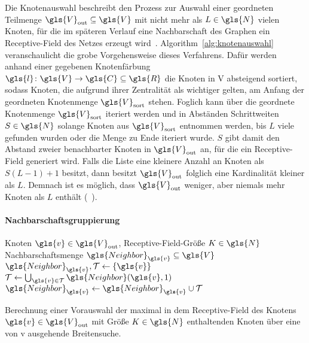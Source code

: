 Die Knotenauswahl beschreibt den Prozess zur Auswahl einer geordneten Teilmenge $\gls{V}_{\mathrm{out}} \subseteq \gls{V}$ mit nicht mehr als $L \in \gls{N}$ vielen Knoten, für die im späteren Verlauf eine Nachbarschaft des Graphen \bzw{} ein Receptive-Field des Netzes erzeugt wird~\cite{patchy}.
Algorithm~\ref{alg:knotenauswahl} veranschaulicht die grobe Vorgehensweise dieses Verfahrens.
Dafür werden anhand einer gegebenen Knotenfärbung $\gls{l} \colon \gls{V} \to \gls{C} \subseteq \gls{R}$ die Knoten in \gls{V} absteigend sortiert, sodass Knoten, die aufgrund ihrer Zentralität als wichtiger gelten, am Anfang der geordneten Knotenmenge $\gls{V}_{\mathrm{sort}}$ stehen.
Foglich kann über die geordnete Knotenmenge $\gls{V}_{\mathrm{sort}}$ iteriert werden und in Abständen \bzw{} Schrittweiten $S \in \gls{N}$ solange Knoten aus $\gls{V}_{\mathrm{sort}}$ entnommen werden, bis $L$ viele gefunden wurden oder die Menge zu Ende iteriert wurde.
$S$ gibt damit den Abstand zweier benachbarter Knoten in $\gls{V}_{\mathrm{out}}$ an, für die ein Receptive-Field generiert wird.
Falls die Liste eine kleinere Anzahl an Knoten als $S\left( L -1 \right) + 1$ besitzt, dann besitzt $\gls{V}_{\mathrm{out}}$ folglich eine Kardinalität kleiner als $L$.
Demnach ist es möglich, dass $\gls{V}_{\mathrm{out}}$ weniger, aber niemals mehr Knoten als $L$ enthält (\vgl{}~\cite{patchy}).

\paragraph{Nachbarschaftsgruppierung}
\label{nachbarschaftsgruppierung}

\begin{algorithm}[t]
\centering
\begin{algorithmic}
  \REQUIRE{} Knoten $\gls{v} \in \gls{V}_{\mathrm{out}}$, Receptive-Field-Größe $K \in \gls{N}$
  \ENSURE{} Nachbarschaftsmenge $\gls{Neighbor}_{\gls{v}} \subseteq \gls{V}$
  \STATE{} $\gls{Neighbor}_{\gls{v}}, \mathcal{T} \leftarrow \left\{\gls{v}\right\}$
    \STATE{} $\mathcal{T} \leftarrow \bigcup_{\gls{v} \in \mathcal{T}} \gls{Neighbor}\left(\gls{v}, 1\right)$
    \STATE{} $\gls{Neighbor}_{\gls{v}} \leftarrow \gls{Neighbor}_{\gls{v}} \cup \mathcal{T}$
  \ENDWHILE{}
\end{algorithmic}
\caption[Nachbarschaftsgruppierung]{Berechnung einer Vorauswahl der maximal in dem Receptive-Field des Knotens $\gls{v} \in \gls{V}_{\mathrm{out}}$ mit Größe $K \in \gls{N}$ enthaltenden Knoten über eine von \gls{v} ausgehende Breitensuche.}
\label{alg:nachbarschaftsgruppierung}
\end{algorithm}

